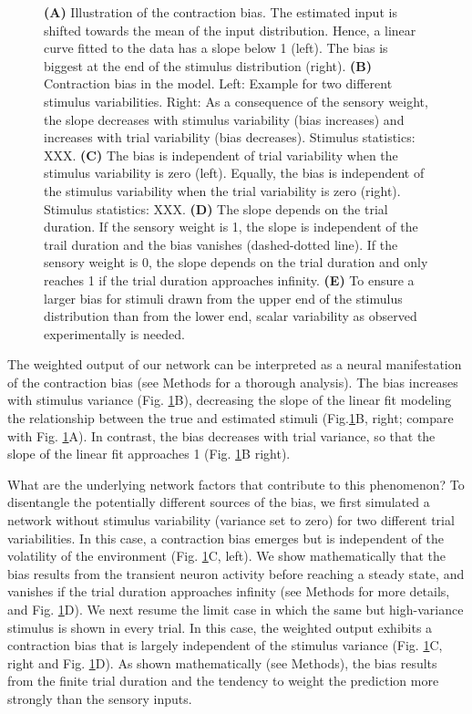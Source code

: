 \documentclass[10pt,a4paper]{article}
\begin{document}
\begin{figure}[t!]
{{\bf (A)} Illustration of the contraction bias. The estimated input is shifted towards the mean of the input distribution. Hence, a linear curve fitted to the data has a slope below 1 (left). The bias is biggest at the end of the stimulus distribution (right).
{\bf (B)} Contraction bias in the model. Left: Example for two different stimulus variabilities. Right: As a consequence of the sensory weight, the slope decreases with stimulus variability (bias increases) and increases with trial variability (bias decreases).  Stimulus statistics: XXX.
{\bf (C)} The bias is independent of trial variability when the stimulus variability is zero (left). Equally, the bias is independent of the stimulus variability when the trial variability is zero (right). Stimulus statistics: XXX.
{\bf (D)} The slope depends on the trial duration. If the sensory weight is 1, the slope is independent of the trail duration and the bias vanishes (dashed-dotted line). If the sensory weight is 0, the slope depends on the trial duration and only reaches 1 if the trial duration approaches infinity. 
{\bf (E)} To ensure a larger bias for stimuli drawn from the upper end of the stimulus distribution than from the lower end, scalar variability as observed experimentally is needed.
}
\label{fig:Fig_5}
\end{figure}
%

The weighted output of our network can be interpreted as a neural manifestation of the contraction bias (see Methods for a thorough analysis). The bias increases with stimulus variance (Fig. \ref{fig:Fig_5}B), decreasing the slope of the linear fit modeling the relationship between the true and estimated stimuli (Fig.\ref{fig:Fig_5}B, right; compare with Fig. \ref{fig:Fig_5}A). In contrast, the bias decreases with trial variance, so that the slope of the linear fit approaches 1 (Fig. \ref{fig:Fig_5}B right).

What are the underlying network factors that contribute to this phenomenon? To disentangle the potentially different sources of the bias, we first simulated a network without stimulus variability (variance set to zero) for two different trial variabilities. In this case, a contraction bias emerges but is independent of the volatility of the environment (Fig. \ref{fig:Fig_5}C, left). We show mathematically that the bias results from the transient neuron activity before reaching a steady state, and vanishes if the trial duration approaches infinity (see Methods for more details, and Fig. \ref{fig:Fig_5}D). We next resume the limit case in which the same but high-variance stimulus is shown in every trial. In this case, the weighted output exhibits a contraction bias that is largely independent of the stimulus variance (Fig. \ref{fig:Fig_5}C, right and Fig. \ref{fig:Fig_5}D). As shown mathematically (see Methods), the bias results from the finite trial duration and the tendency to weight the prediction more strongly than the sensory inputs. 
\end{document}
